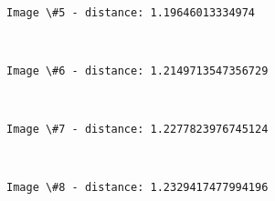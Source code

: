 \documentclass[11pt]{article}
\begin{document}
    \begin{center}
    \end{center}
    { \hspace*{\fill} \\}
    
    \begin{Verbatim}[commandchars=\\\{\}]
Image \#5 - distance: 1.19646013334974

    \end{Verbatim}

    \begin{center}
    \end{center}
    { \hspace*{\fill} \\}
    
    \begin{Verbatim}[commandchars=\\\{\}]
Image \#6 - distance: 1.2149713547356729

    \end{Verbatim}

    \begin{center}
    \end{center}
    { \hspace*{\fill} \\}
    
    \begin{Verbatim}[commandchars=\\\{\}]
Image \#7 - distance: 1.2277823976745124

    \end{Verbatim}

    \begin{center}
    \end{center}
    { \hspace*{\fill} \\}
    
    \begin{Verbatim}[commandchars=\\\{\}]
Image \#8 - distance: 1.2329417477994196

    \end{Verbatim}

    \begin{center}
    \end{center}
    { \hspace*{\fill} \\}
    
\end{document}
